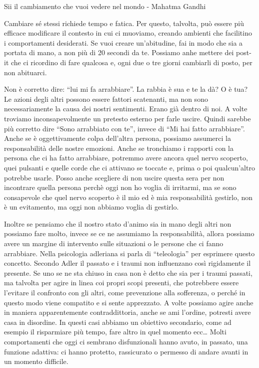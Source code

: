 \documentclass[12pt]{book} %
\begin{document}
Sii il cambiamento che vuoi vedere nel mondo - Mahatma Gandhi

Cambiare sé stessi richiede tempo e fatica. Per questo, talvolta, può essere più efficace modificare il contesto in cui ci muoviamo, creando ambienti che facilitino i comportamenti desiderati. Se vuoi creare un'abitudine, fai in modo che sia a portata di mano, a non più di 20 secondi da te. Possiamo anhe mettere dei post-it che ci ricordino di fare qualcosa e, ogni due o tre giorni cambiarli di posto, per non abituarci. 

Non è corretto dire: “lui mi fa arrabbiare”. La rabbia è sua e te la dà? O è tua? Le azioni degli altri possono essere fattori scatenanti, ma non sono necessariamente la causa dei nostri sentimenti. Erano già dentro di noi. A volte troviamo inconsapevolmente un pretesto esterno per farle uscire. Quindi sarebbe più corretto dire “Sono arrabbiato con te”, invece di “Mi hai fatto arrabbiare”. Anche se è oggettivamente colpa dell'altra persona, possiamo assumerci la responsabilità delle nostre emozioni. Anche se tronchiamo i rapporti con la persona che ci ha fatto arrabbiare, potremmo avere ancora quel nervo scoperto, quei pulsanti e quelle corde che ci attivano se toccate e, prima o poi qualcun'altro potrebbe usarle. 
Posso anche scegliere di non uscire questa sera per non incontrare quella persona perchè oggi non ho voglia di irritarmi, ma se sono consapevole che quel nervo scoperto è il mio ed è mia responsabilità gestirlo, non è un evitamento, ma oggi non abbiamo voglia di gestirlo.

Inoltre se pensiamo che il nostro stato d'animo sia in mano degli altri non possiamo fare molto, invece se ce ne assumiamo la responsabilità, allora possiamo avere un margine di intervento sulle situazioni o le persone che ci fanno arrabbiare.
Nella psicologia adleriana si parla di “teleologia” per esprimere questo concetto.
Secondo Adler il passato e i traumi non influenzano così rigidamente il presente. Se uno se ne sta chiuso in casa non è detto che sia per i traumi
passati, ma talvolta per agire in linea coi propri scopi presenti, che potrebbere essere l'evitare il confronto con gli altri, come prevenzione alla sofferenza, o perché in questo modo viene compatito e si sente apprezzato.
A volte possiamo agire anche in maniera apparentemente contraddittoria, anche se ami l'ordine, potresti avere casa in disordine. In questi casi abbiamo un obiettivo secondario, come ad esempio il risparmiare più tempo, fare altro in quel momento ecc…
Molti comportamenti che oggi ci sembrano disfunzionali hanno avuto, in passato, una funzione adattiva: ci hanno protetto, rassicurato o permesso di andare avanti in un momento difficile.
\end{document}
